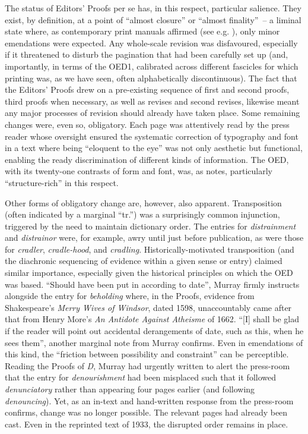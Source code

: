 \documentclass[output=paper,colorlinks,citecolor=brown,arabicfont,chinesefont]{langscibook}
\begin{document}
The status of Editors’ Proofs per se has, in this respect, particular salience. They exist, by definition, at a point of “almost closure” or “almost finality”~-- a liminal state where, as contemporary print manuals affirmed (see e.g. \citealt{Ford1854, Graham1848}), only minor emendations were expected. Any whole-scale revision was disfavoured, especially if it threatened to disturb the pagination that had been carefully set up (and, importantly, in terms of the OED1, calibrated across different fascicles for which printing was, as we have seen, often alphabetically discontinuous). The fact that the Editors’ Proofs drew on a pre-existing sequence of first and second proofs, third proofs when necessary, as well as revises and second revises, likewise meant any major processes of revision should already have taken place. Some remaining changes were, even so, obligatory. Each page was attentively read by the press reader whose oversight ensured the systematic correction of typography and font in a text where being “eloquent to the eye” \citep[vi]{Murray1888} was not only aesthetic but functional, enabling the ready discrimination of different kinds of information. The OED, with its twenty-one contrasts of form and font, was, as \citet{Luna2004} notes, particularly “structure-rich” in this respect.

Other forms of obligatory change are, however, also apparent. Transposition (often indicated by a marginal “tr.”) was a surprisingly common injunction, triggered by the need to maintain dictionary order. The entries for \emph{distrainment} and \emph{distrainor} were, for example, awry until just before publication, as were those for \emph{cradler}, \emph{cradle-hood}, and \emph{cradling}. Historically\hyp motivated transposition (and the diachronic sequencing of evidence within a given sense or entry) claimed similar importance, especially given the historical principles on which the OED was based. “Should have been put in according to date”, Murray firmly instructs alongside the entry for \emph{beholding} where, in the Proofs, evidence from Shakespeare’s \emph{Merry Wives of Windsor}, dated 1598, unaccountably came after that from Henry More’s \emph{An Antidote Against Atheisme} of 1662. “[I] shall be glad if the reader will point out accidental derangements of date, such as this, when he sees them”, another marginal note from Murray confirms. Even in emendations of this kind, the “friction between possibility and constraint” can be perceptible. Reading the Proofs of \textit{D}, Murray had urgently written to alert the press-room that the entry for \emph{denourishment} had been misplaced such that it followed \emph{denunciatory} rather than appearing four pages earlier (and following \emph{denouncing}). Yet, as an in-text and hand-written response from the press-room confirms, change was no longer possible. The relevant pages had already been cast. Even in the reprinted text of 1933, the disrupted order remains in place. 
\end{document}
